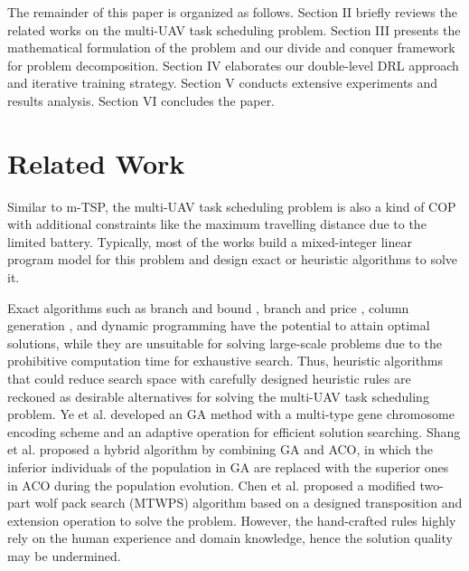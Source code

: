 \documentclass[lettersize,journal]{IEEEtran}
\begin{document}
	
	The remainder of this paper is organized as follows. Section II briefly reviews the related works on the multi-UAV task scheduling problem. Section III presents the mathematical formulation of the problem and our divide and conquer framework for problem decomposition. Section IV elaborates our double-level DRL approach and iterative training strategy. Section V conducts extensive experiments and results analysis. Section VI concludes the paper.
	
	
	\section{Related Work}
	
	Similar to m-TSP, the multi-UAV task scheduling problem is also a kind of COP with additional constraints like the maximum travelling distance due to the limited battery. Typically, most of the works build a mixed-integer linear program model \cite{richardsCoordinationControlMultiple2002} for this problem and design exact or heuristic algorithms to solve it.
	
	Exact algorithms such as branch and bound \cite{ramirez-atenciaPerformanceEvaluationMultiUAV2015}, branch and price \cite{mitchellMultirobotLongtermPersistent2015}, column generation \cite{mufalliSimultaneousSensorSelection2012}, and dynamic programming \cite{alighanbariCooperativeTaskAssignment2005} have the potential to attain optimal solutions, while they are unsuitable for solving large-scale problems due to the prohibitive computation time for exhaustive search. Thus, heuristic algorithms that could reduce search space with carefully designed heuristic rules are reckoned as desirable alternatives for solving the multi-UAV task scheduling problem. Ye et al. \cite{yeCooperativeTaskAssignment2020} developed an GA method with a multi-type gene chromosome encoding scheme and an adaptive operation for efficient solution searching. Shang et al. \cite{shangGAACOHybridAlgorithm2014} proposed a hybrid algorithm by combining GA and ACO, in which the inferior individuals of the population in GA are replaced with the superior ones in ACO during the population evolution. Chen et al. \cite{chenMultiUAVTaskAssignment2018a} proposed a modified two-part wolf pack search (MTWPS) algorithm based on a designed transposition and extension operation to solve the problem. However, the hand-crafted rules highly rely on the human experience and domain knowledge, hence the solution quality may be undermined.
	
\end{document}
